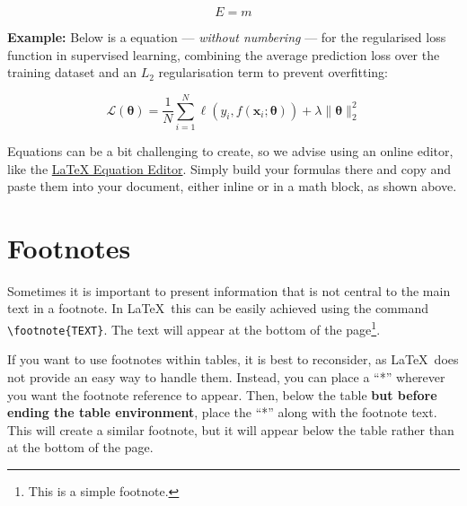 \begin{equation}
    \label{eq:equation-01}
    E=m
\end{equation}

\textbf{Example:} Below is a equation --- \textit{without numbering} --- for the regularised loss function in supervised learning, combining the average prediction loss over the training dataset and an \(L_2\) regularisation term to prevent overfitting:

\[
    \mathcal{L}(\boldsymbol{\theta}) = \frac{1}{N} \sum_{i=1}^{N} \ell(y_i, f(\mathbf{x}_i; \boldsymbol{\theta})) + \lambda \|\boldsymbol{\theta}\|_2^2
\]

Equations can be a bit challenging to create, so we advise using an online editor, like the \href{https://latexeditor.lagrida.com/}{LaTeX Equation Editor}. Simply build your formulas there and copy and paste them into your document, either inline or in a math block, as shown above.

\section{Footnotes}
Sometimes it is important to present information that is not central to the main text in a footnote. In \LaTeX\, this can be easily achieved using the command \verb|\footnote{TEXT}|. The text will appear at the bottom of the page\footnote{This is a simple footnote.}.

If you want to use footnotes within tables, it is best to reconsider, as \LaTeX\ does not provide an easy way to handle them. Instead, you can place a ``*'' wherever you want the footnote reference to appear. Then, below the table \textbf{but before ending the table environment}, place the ``*'' along with the footnote text. This will create a similar footnote, but it will appear below the table rather than at the bottom of the page.
